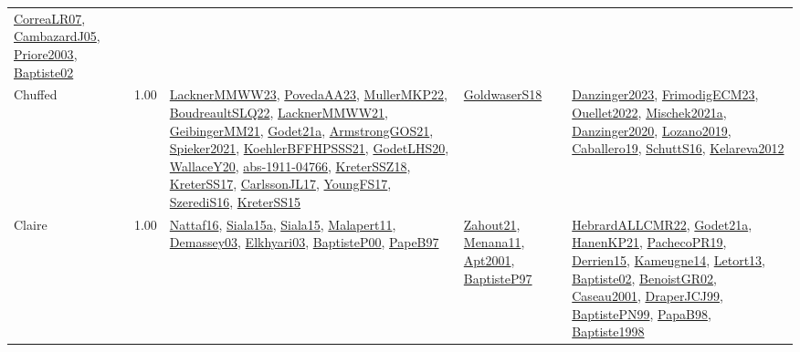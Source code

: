 {\begin{longtable}{p{3cm}r>{\raggedright\arraybackslash}p{6cm}>{\raggedright\arraybackslash}p{6cm}>{\raggedright\arraybackslash}p{8cm}}
\hyperref[detail:CorreaLR07]{CorreaLR07}, \hyperref[detail:CambazardJ05]{CambazardJ05}, \hyperref[detail:Priore2003]{Priore2003}, \hyperref[detail:Baptiste02]{Baptiste02}\\
\index{Chuffed}\index{CPSystems!Chuffed}Chuffed &  1.00 & \hyperref[detail:LacknerMMWW23]{LacknerMMWW23}, \hyperref[detail:PovedaAA23]{PovedaAA23}, \hyperref[detail:MullerMKP22]{MullerMKP22}, \hyperref[detail:BoudreaultSLQ22]{BoudreaultSLQ22}, \hyperref[detail:LacknerMMWW21]{LacknerMMWW21}, \hyperref[detail:GeibingerMM21]{GeibingerMM21}, \hyperref[detail:Godet21a]{Godet21a}, \hyperref[detail:ArmstrongGOS21]{ArmstrongGOS21}, \hyperref[detail:Spieker2021]{Spieker2021}, \hyperref[detail:KoehlerBFFHPSSS21]{KoehlerBFFHPSSS21}, \hyperref[detail:GodetLHS20]{GodetLHS20}, \hyperref[detail:WallaceY20]{WallaceY20}, \hyperref[detail:abs-1911-04766]{abs-1911-04766}, \hyperref[detail:KreterSSZ18]{KreterSSZ18}, \hyperref[detail:KreterSS17]{KreterSS17}, \hyperref[detail:CarlssonJL17]{CarlssonJL17}, \hyperref[detail:YoungFS17]{YoungFS17}, \hyperref[detail:SzerediS16]{SzerediS16}, \hyperref[detail:KreterSS15]{KreterSS15} & \hyperref[detail:GoldwaserS18]{GoldwaserS18} & \hyperref[detail:Danzinger2023]{Danzinger2023}, \hyperref[detail:FrimodigECM23]{FrimodigECM23}, \hyperref[detail:Ouellet2022]{Ouellet2022}, \hyperref[detail:Mischek2021a]{Mischek2021a}, \hyperref[detail:Danzinger2020]{Danzinger2020}, \hyperref[detail:Lozano2019]{Lozano2019}, \hyperref[detail:Caballero19]{Caballero19}, \hyperref[detail:SchuttS16]{SchuttS16}, \hyperref[detail:Kelareva2012]{Kelareva2012}\\
\index{Claire}\index{CPSystems!Claire}Claire &  1.00 & \hyperref[detail:Nattaf16]{Nattaf16}, \hyperref[detail:Siala15a]{Siala15a}, \hyperref[detail:Siala15]{Siala15}, \hyperref[detail:Malapert11]{Malapert11}, \hyperref[detail:Demassey03]{Demassey03}, \hyperref[detail:Elkhyari03]{Elkhyari03}, \hyperref[detail:BaptisteP00]{BaptisteP00}, \hyperref[detail:PapeB97]{PapeB97} & \hyperref[detail:Zahout21]{Zahout21}, \hyperref[detail:Menana11]{Menana11}, \hyperref[detail:Apt2001]{Apt2001}, \hyperref[detail:BaptisteP97]{BaptisteP97} & \hyperref[detail:HebrardALLCMR22]{HebrardALLCMR22}, \hyperref[detail:Godet21a]{Godet21a}, \hyperref[detail:HanenKP21]{HanenKP21}, \hyperref[detail:PachecoPR19]{PachecoPR19}, \hyperref[detail:Derrien15]{Derrien15}, \hyperref[detail:Kameugne14]{Kameugne14}, \hyperref[detail:Letort13]{Letort13}, \hyperref[detail:Baptiste02]{Baptiste02}, \hyperref[detail:BenoistGR02]{BenoistGR02}, \hyperref[detail:Caseau2001]{Caseau2001}, \hyperref[detail:DraperJCJ99]{DraperJCJ99}, \hyperref[detail:BaptistePN99]{BaptistePN99}, \hyperref[detail:PapaB98]{PapaB98}, \hyperref[detail:Baptiste1998]{Baptiste1998}\\

\end{longtable}}
